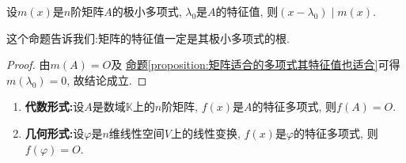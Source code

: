 \documentclass[../../main.tex]{subfiles}
\begin{document}
\begin{proposition}\label{proposition:矩阵的特征值一定是其极小多项式的根}
设$m(x)$是$n$阶矩阵$A$的极小多项式, $\lambda_0$是$A$的特征值, 则$(x - \lambda_0) \mid m(x)$.
\end{proposition}
\begin{note}
这个命题告诉我们:矩阵的特征值一定是其极小多项式的根.
\end{note}
\begin{proof}
由$m(A) = O$及
\hyperref[proposition:矩阵适合的多项式其特征值也适合]{命题\ref{proposition:矩阵适合的多项式其特征值也适合}}可得$m(\lambda_0) = 0$, 故结论成立.
\end{proof}

\begin{theorem}\label{theorem:Cayley-Hamilton定理}
\begin{enumerate}
\item \textbf{代数形式:}设$A$是数域$\mathbb{K}$上的$n$阶矩阵, $f(x)$是$A$的特征多项式, 则$f(A) = O$.

\item \textbf{几何形式:}设$\varphi$是$n$维线性空间$V$上的线性变换, $f(x)$是$\varphi$的特征多项式, 则$f(\varphi) = O$.
\end{enumerate}
\end{theorem}
\end{document}
